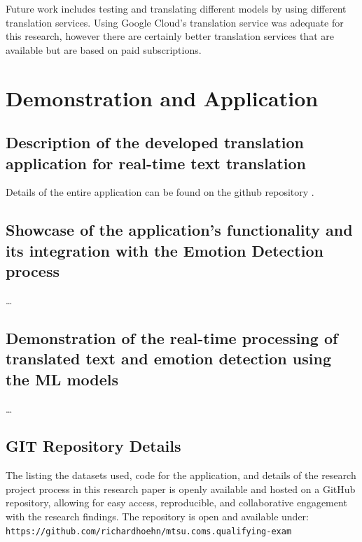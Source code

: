 \documentclass[11pt]{article}
\begin{document}
Future work includes testing and translating different models by using different translation services. Using Google Cloud's translation service was adequate for this research, however there are certainly better translation services that are available but are based on paid subscriptions.

\clearpage
\section{Demonstration and Application}

\subsection{Description of the developed translation application for real-time text translation}
Details of the entire application can be found on the github repository \cite{Hoehn_Improving_Emotion_Detection_2023}.

\subsection{Showcase of the application's functionality and its integration with the Emotion Detection process}
\ldots

\subsection{Demonstration of the real-time processing of translated text and emotion detection using the ML models}
\ldots

\subsection{GIT Repository Details}
The listing the datasets used, code for the application, and details of the research project process in this research paper is openly available and hosted on a GitHub repository, allowing for easy access, reproducible, and collaborative engagement with the research findings. The repository is open and available under: \texttt{https://github.com/richardhoehn/mtsu.coms.qualifying-exam}\cite{Hoehn_Improving_Emotion_Detection_2023}
\clearpage


\printbibliography
\clearpage


\listoffigures
\clearpage


\appendix
\end{document}
